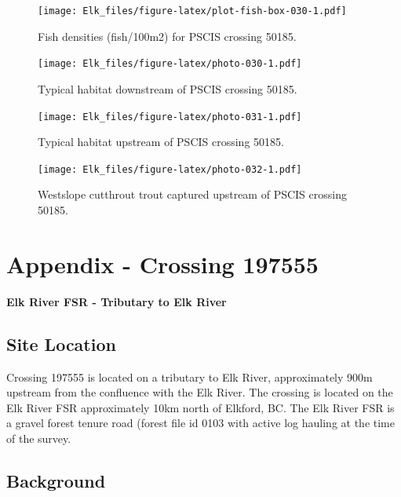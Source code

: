 \documentclass[
]{book}
\begin{document}
\begin{figure}
\centering
\texttt{[image: Elk\_files/figure-latex/plot-fish-box-030-1.pdf]}
\caption{\label{fig:plot-fish-box-030}Fish densities (fish/100m2) for PSCIS crossing 50185.}
\end{figure}

\begin{figure}
\centering
\texttt{[image: Elk\_files/figure-latex/photo-030-1.pdf]}
\caption{\label{fig:photo-030}Typical habitat downstream of PSCIS crossing 50185.}
\end{figure}

\begin{figure}
\centering
\texttt{[image: Elk\_files/figure-latex/photo-031-1.pdf]}
\caption{\label{fig:photo-031}Typical habitat upstream of PSCIS crossing 50185.}
\end{figure}

\begin{figure}
\centering
\texttt{[image: Elk\_files/figure-latex/photo-032-1.pdf]}
\caption{\label{fig:photo-032}Westslope cutthrout trout captured upstream of PSCIS crossing 50185.}
\end{figure}

\hypertarget{appendix---crossing-197555}{%
\chapter*{Appendix - Crossing 197555}\label{appendix---crossing-197555}}

\textbf{Elk River FSR - Tributary to Elk River}

\hypertarget{site-location-3}{%
\section*{Site Location}\label{site-location-3}}

Crossing 197555 is located on a tributary to Elk River, approximately 900m upstream from the confluence with the Elk River. The crossing is located on the Elk River FSR approximately 10km north of Elkford, BC. The Elk River FSR is a gravel forest tenure road (forest file id 0103 with active log hauling at the time of the survey.

\hypertarget{background-4}{%
\section*{Background}\label{background-4}}
\end{document}

